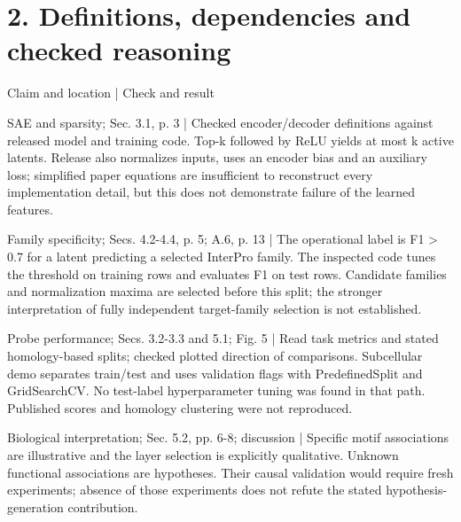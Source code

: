 \documentclass[10pt]{article}
\begin{document}
\section*{2. Definitions, dependencies and checked reasoning}
Claim and location | Check and result\par
SAE and sparsity; Sec. 3.1, p. 3 | Checked encoder/decoder definitions against released model and training code. Top-k followed by ReLU yields at most k active latents. Release also normalizes inputs, uses an encoder bias and an auxiliary loss; simplified paper equations are insufficient to reconstruct every implementation detail, but this does not demonstrate failure of the learned features.\par
Family specificity; Secs. 4.2-4.4, p. 5; A.6, p. 13 | The operational label is F1 > 0.7 for a latent predicting a selected InterPro family. The inspected code tunes the threshold on training rows and evaluates F1 on test rows. Candidate families and normalization maxima are selected before this split; the stronger interpretation of fully independent target-family selection is not established.\par
Probe performance; Secs. 3.2-3.3 and 5.1; Fig. 5 | Read task metrics and stated homology-based splits; checked plotted direction of comparisons. Subcellular demo separates train/test and uses validation flags with PredefinedSplit and GridSearchCV. No test-label hyperparameter tuning was found in that path. Published scores and homology clustering were not reproduced.\par
Biological interpretation; Sec. 5.2, pp. 6-8; discussion | Specific motif associations are illustrative and the layer selection is explicitly qualitative. Unknown functional associations are hypotheses. Their causal validation would require fresh experiments; absence of those experiments does not refute the stated hypothesis-generation contribution.\par
\end{document}
